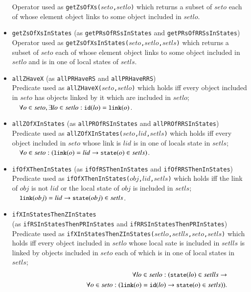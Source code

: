 \documentclass[12pt]{report}
\newcommand{\ra}{\rightarrow}
\newcommand{\mbstt}[1]{\mbox{\small{\tt {#1}}}}
\newcommand{\stt}[1]{{\small{\tt {#1}}}}
\begin{document}
\begin{itemize}
  Operator used as \stt{getZsOfXs($seto$,$setlo$)} which returns a
  subset of $seto$ each of whose element object links to some object
  included in $setlo$.
\item \stt{getZsOfXsInStates} (as \stt{getPRsOfRSsInStates} and \stt{getPRsOfRRSsInStates})\\
  Operator used as \stt{getZsOfXsInStates($seto$,$setlo$,$setls$)}
  which returns a subset of $seto$ each of whose element object links
  to some object included in $setlo$ and is in one of local states of
  $setls$.
\item \stt{allZHaveX} (as \stt{allPRHaveRS} and \stt{allPRHaveRRS})\\
  Predicate used as \stt{allZHaveX($seto$,$setlo$)} which holds iff
  every object included in $seto$ has objects linked by it
  which are included in $setlo$;\\$~~~~\forall o\in seto,\exists lo\in
  setlo:\mbstt{id}(lo)=\mbstt{link}(o)$.
\item \stt{allZOfXInStates} (as \stt{allPROfRSInStates} and \stt{allPROfRRSInStates})\\
  Predicate used as \stt{allZOfXInStates($seto$,$lid$,$setls$)} which
  holds iff every object included in $seto$ whose link is $lid$
  is in one of locals state in $setls$;\\$~~~~\forall o\in
  seto:(\mbstt{link}(o)=lid\ra\mbstt{state}(o)\in setls)$.
\item \stt{ifOfXThenInStates} (as \stt{ifOfRSThenInStates} and \stt{ifOfRRSThenInStates})\\
  Predicate used as \stt{ifOfXThenInStates($obj$,$lid$,$setls$)} which
  holds iff the link of $obj$ is not $lid$ or the local state of
  $obj$ is included in
  $setls$;\\$~~~~\mbstt{link}(obj)=lid\ra\mbstt{state}(obj)\in setls$.
\item \stt{ifXInStatesThenZInStates}\\
(as \stt{ifRSInStatesThenPRInStates} and \stt{ifRRSInStatesThenPRInStates})\\
  Predicate used as
  \stt{ifXInStatesThenZInStates($setlo$,$setlls$,$seto$,$setls$)}
  which holds iff every object included in $setlo$ whose local
  sate is included in $setlls$ is linked by objects included in $seto$
  each of which is in one of local states in $setls$;
  \vspace{-0.3cm}
  \begin{eqnarray*}
    &&\forall lo\in setlo:(\mbstt{state}(lo)\in setlls\ra\\
    &&~~~~~~~~~~~~~~~~~~~~~~~~~~~~
    \forall o\in seto: (\mbstt{link}(o)=\mbstt{id}(lo)\ra\mbstt{state}(o)\in setls)).
  \end{eqnarray*}
\end{itemize}
\end{document}
